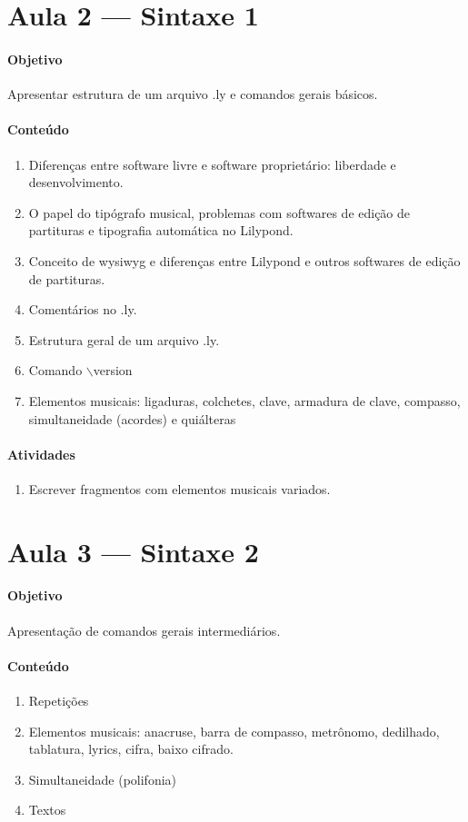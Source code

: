 \documentclass[12pt,brazil]{article}
\begin{document}
\break

\section{Aula 2 --- Sintaxe 1}
\paragraph{Objetivo}
Apresentar estrutura de um arquivo .ly e comandos gerais básicos.
\paragraph{Conteúdo}
\begin{enumerate}
\item Diferenças entre software livre e software proprietário:
  liberdade e desenvolvimento.
\item O papel do tipógrafo musical, problemas com softwares de edição
  de partituras e tipografia automática no Lilypond.
\item Conceito de wysiwyg e diferenças entre Lilypond e outros
  softwares de edição de partituras.
\item Comentários no .ly.
\item Estrutura geral de um arquivo .ly.
\item Comando $\backslash$version
\item Elementos musicais: ligaduras, colchetes, clave, armadura de
  clave, compasso, simultaneidade (acordes) e quiálteras
\end{enumerate}
\paragraph{Atividades}
\begin{enumerate}
\item Escrever fragmentos com elementos musicais variados.
\end{enumerate}

\section{Aula 3 --- Sintaxe 2}
\paragraph{Objetivo}
Apresentação de comandos gerais intermediários.
\paragraph{Conteúdo}
\begin{enumerate}
\item Repetições
\item Elementos musicais: anacruse, barra de compasso, metrônomo,
  dedilhado, tablatura, lyrics, cifra, baixo cifrado.
\item Simultaneidade (polifonia)
\item Textos
\end{enumerate}
\end{document}
